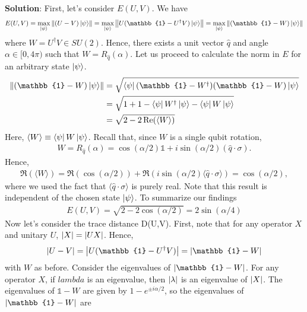\documentclass{book}
\begin{document}
    \textbf{Solution}: First, let's consider $E(U,V)$. We have
    \begin{align}
        E(U,V) = \max_{\ket{\psi}} \norm{(U-V)\ket{\psi}} = \max_{\ket{\psi}} \norm{U(\mathbb{1}-U^\dagger V)\ket{\psi}} = \max_{\ket{\psi}} \norm{(\mathbb{1}-W)\ket{\psi}} 
    \end{align}
    where $W = U^\dagger V \in SU(2)$. Hence, there exists a unit vector $\hat{q}$ and angle $\alpha\in [0,4\pi)$ such that $W = R_{\hat{q}}(\alpha)$. Let us proceed to calculate the norm in $E$ for an arbitrary state $\ket{\psi}$.
    \begin{align}
    \begin{aligned}
        \norm{(\mathbb{1}-W)\ket{\psi}} &= \sqrt{\bra{\psi}(\mathbb{1}-W^\dagger)(\mathbb{1}-W)\ket{\psi}} \\
        &= \sqrt{1 + 1 - \bra{\psi}W^\dagger \ket{\psi} - \bra{\psi}W\ket{\psi}} \\
        &= \sqrt{2-2 \Re(\langle W\rangle)}
    \end{aligned}
    \end{align}
    Here, $\langle W \rangle \equiv \bra{\psi} W \ket{\psi}$. Recall that, since $W$ is a single qubit rotation,
    \begin{align}
        W = R_{\hat{q}}(\alpha) = \cos(\alpha/2)\mathbb{1} + i \sin(\alpha/2) (\hat{q}\cdot \sigma).
    \end{align}
    Hence,
    \begin{align}
        \Re(\langle W \rangle) = \Re(\cos(\alpha /2)) + \Re(i \sin(\alpha/2) \langle \hat{q}\cdot \sigma \rangle) = \cos(\alpha/2),
    \end{align}
    where we used the fact that $\langle \hat{q}\cdot \sigma \rangle$ is purely real. Note that this result is independent of the chosen state $\ket{\psi}$. To summarize our findings
    \begin{align} \label{eq:ExerciseA3.1 E(U,V) result}
        E(U,V) = \sqrt{2 - 2 \cos(\alpha/2)} = 2 \sin (\alpha/4)
    \end{align}
    Now let's consider the trace distance D(U,V). First, note that for any operator $X$ and unitary $U$, $\abs{X} = \abs{UX}$. Hence,
    \begin{align}
        \abs{U-V} = \abs{U(\mathbb{1}-U^\dagger V)} = \abs{\mathbb{1}- W}
    \end{align}
    with $W$ as before. Consider the eigenvalues of $\abs{\mathbb{1}- W}$. For any operator $X$, if $lambda$ is an eigenvalue, then $\abs{\lambda}$ is an eigenvalue of $\abs{X}$. The eigenvalues of $\mathbb{1}-W$ are given by $1 - e^{\pm i\alpha/2}$, so the eigenvalues of $\abs{\mathbb{1}- W}$ are
\end{document}
